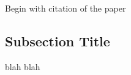 \documentclass[../main-paper.tex]{subfiles}
\begin{document}
Begin with citation of the paper

\subsection{Subsection Title}
blah blah
\end{document}
